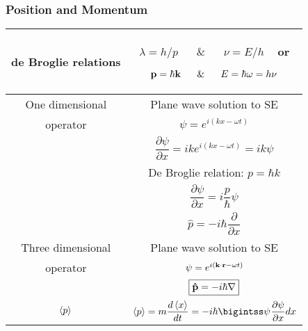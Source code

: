\subsubsection{Position and Momentum}
\center
\begin{tabular}{|c|c|}
\hline

de Broglie relations & \begin{minipage}{.4\textwidth}
 $\lambda = h/p \; \;\;\; \;\; \& \; \;\;\; \;\; \nu = E/h \; \; \;$ or
 
 $\bold{p} = \hbar \bold{k}  \;\; \;\;\; \;  \&   \;\;\; \;\;\;  E = \hbar \omega =h \nu$
 
 \end{minipage}
 
 \\ \hline

One dimensional & Plane wave solution to SE \\
 operator & $\psi = e^{i(kx-\omega t)} $\\
&$\dfrac{\partial \psi}{ \partial x} = ike^{i(kx-\omega t)}  = ik\psi$ \\
& De Broglie relation: $p = \hbar k$ \\
& $\dfrac{\partial \psi}{ \partial x} = i \dfrac{p}{\hbar}\psi$ \\
&$\boxed{ \hat p = -i\hbar \dfrac{\partial }{ \partial x} }$

\\ \hline

Three dimensional & Plane wave solution to SE \\
operator & $\psi = e^{i(\bold{k} \cdot \bold{r} -\omega t)} $\\
& $\boxed{  \bold{\hat p} = -i\hbar \bold{\nabla} } $

\\ \hline

$\braket{p} $ & $\braket{p} = m\dfrac{d \braket{x}}{dt} = -i\hbar \bigintss \psi^{\*}\dfrac{\partial \psi}{\partial x} dx$

\\ \hline
\end{tabular}
\flushleft




